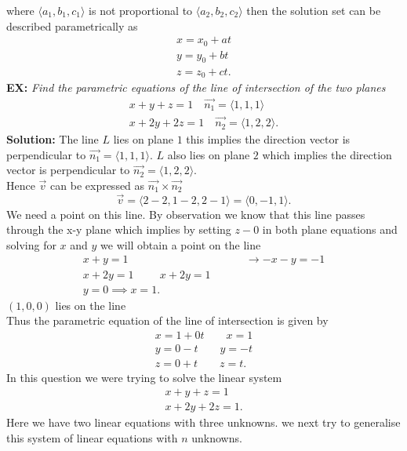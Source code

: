 \documentclass{report}
\begin{document}
where $\langle a_1,b_1,c_1  \rangle $ is not proportional to $\langle a_2,b_2,c_2  \rangle $ then the solution set can be described parametrically as 
\begin{align*}
        x=x_0+at\\
        y=y_0+bt\\
        z=z_0+ct
.\end{align*}
\textbf{EX:}  \textit{Find the parametric equations of the line of intersection of the two planes} 
\begin{align*}
        x+y+z =1 \quad \vec{n_1} = \langle 1,1,1  \rangle \\
        x+2y+2z=1 \quad \vec{n_2} = \langle 1,2,2  \rangle 
.\end{align*}
\textbf{Solution:} The line $L$ lies on plane $1$  this implies the direction vector is perpendicular to $\vec{n_1} = \langle 1,1,1  \rangle $. $L$ also lies on plane $2$ which implies the direction vector is perpendicular to $\vec{n_2} = \langle 1,2,2  \rangle $.\\
Hence $\vec{v} $ can be expressed as $\vec{n_1} \times  \vec{n_2} $ 
\[
\vec{v} = \langle 2-2,1-2,2-1  \rangle = \langle 0,-1,1  \rangle 
.\] We need a point on this line. By observation we know that this line passes through the x-y plane which implies by setting $z-0$ in both plane equations and solving for $x$ and $y$ we will obtain a point on the line 
\begin{align*}
        x+y=1 & \mathrel{\hspace{1cm}} \to-x-y=-1\\
        x+2y=1 \mathrel{\hspace{1cm}} x+2y=1\\
        y=0 \implies x=1
.\end{align*}
$\left( 1,0,0 \right) $ lies on the line\\
Thus the parametric equation of the line of intersection is given by
\begin{align*}
        x=1+0t \qquad x=1\\
        y=0-t \qquad y=-t\\
        z=0+t \qquad z=t
.\end{align*}
In this question we were trying to solve the linear system 
\begin{align*}
        x+y+z=1\\
        x+2y+2z=1
.\end{align*}   
Here we have two linear equations with three unknowns. we next try to generalise this system of linear equations with $n$ unknowns.\\
\end{document}

